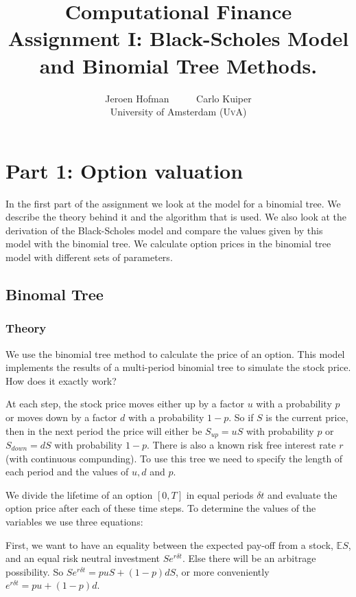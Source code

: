 \documentclass[11pt,a4paper]{article}
\author{Jeroen Hofman \ \ \ \ \ Carlo Kuiper\\
[15pt] University of Amsterdam (\textsc{UvA})}
\title{Computational Finance\\
  Assignment I: Black-Scholes Model and Binomial Tree Methods.}
\begin{document}
\maketitle
\captionsetup{width=0.8\textwidth}
\thispagestyle{empty}

\newpage
\tableofcontents
\newpage

\section{Part 1: Option valuation}

In the first part of the assignment we look at the model for a binomial tree. We describe the theory behind it and the algorithm that is used. We also look at the derivation of the Black-Scholes model and compare the values given by this model with the binomial tree. We calculate option prices in the binomial tree model with different sets of parameters.

\subsection{Binomal Tree}
\subsubsection{Theory}
We use the binomial tree method to calculate the price of an option. This model implements the results of a multi-period binomial tree to simulate the stock price. How does it exactly work?

At each step, the stock price moves either up by a factor $u$ with a probability $p$ or moves down by a factor $d$ with a probability $1-p$. So if $S$ is the current price, then in the next period the price will either be $S_{up}=u S$ with probability $p$ or $S_{down}=dS$ with probability $1-p$. There is also a known risk free interest rate $r$ (with continuous compunding). To use this tree we need to specify the length of each period and the values of $u,d$ and $p$.

We divide the lifetime of an option $[0,T]$ in equal periods $\delta t$ and evaluate the option price after each of these time steps. To determine the values of the variables we use three equations:

First, we want to have an equality between the expected pay-off from a stock, $\mathbb{E}S$, and an equal risk neutral investment $S e^{r\delta t}$. Else there will be an arbitrage possibility. So $S e^{r\delta t}=puS+(1-p)dS$, or more conveniently $e^{r\delta t}=pu+(1-p)d$.
\end{document}
